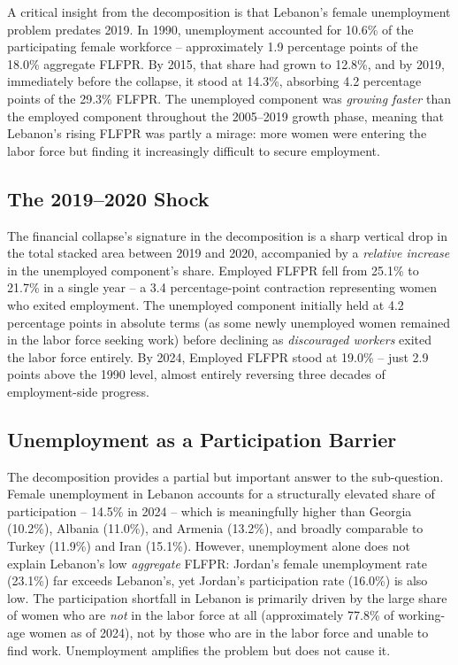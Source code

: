 \documentclass[12pt,a4paper]{article}
\begin{document}
A critical insight from the decomposition is that Lebanon's female unemployment problem predates 2019. In 1990, unemployment accounted for 10.6\% of the participating female workforce -- approximately 1.9 percentage points of the 18.0\% aggregate FLFPR. By 2015, that share had grown to 12.8\%, and by 2019, immediately before the collapse, it stood at 14.3\%, absorbing 4.2 percentage points of the 29.3\% FLFPR. The unemployed component was \textit{growing faster} than the employed component throughout the 2005--2019 growth phase, meaning that Lebanon's rising FLFPR was partly a mirage: more women were entering the labor force but finding it increasingly difficult to secure employment.

\subsection{The 2019--2020 Shock}

The financial collapse's signature in the decomposition is a sharp vertical drop in the total stacked area between 2019 and 2020, accompanied by a \textit{relative increase} in the unemployed component's share. Employed FLFPR fell from 25.1\% to 21.7\% in a single year -- a 3.4 percentage-point contraction representing women who exited employment. The unemployed component initially held at 4.2 percentage points in absolute terms (as some newly unemployed women remained in the labor force seeking work) before declining as \textit{discouraged workers} exited the labor force entirely. By 2024, Employed FLFPR stood at 19.0\% -- just 2.9 points above the 1990 level, almost entirely reversing three decades of employment-side progress.

\subsection{Unemployment as a Participation Barrier}

The decomposition provides a partial but important answer to the sub-question. Female unemployment in Lebanon accounts for a structurally elevated share of participation -- 14.5\% in 2024 -- which is meaningfully higher than Georgia (10.2\%), Albania (11.0\%), and Armenia (13.2\%), and broadly comparable to Turkey (11.9\%) and Iran (15.1\%). However, unemployment alone does not explain Lebanon's low \textit{aggregate} FLFPR: Jordan's female unemployment rate (23.1\%) far exceeds Lebanon's, yet Jordan's participation rate (16.0\%) is also low. The participation shortfall in Lebanon is primarily driven by the large share of women who are \textit{not} in the labor force at all (approximately 77.8\% of working-age women as of 2024), not by those who are in the labor force and unable to find work. Unemployment amplifies the problem but does not cause it.
\end{document}
